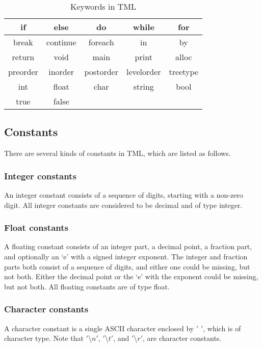 \documentclass[12pt,psfig,a4]{article}
\begin{document}
\begin{table}[!ht]
\begin{center}
\begin{tabular}{| c | c | c | c | c |}
\hline
if & else & do & while & for \\
\hline
break & continue & foreach & in & by     \\  %
\hline
return & void & main & print & alloc \\
\hline
preorder & inorder & postorder & levelorder & treetype\\
\hline
int & float & char & string & bool \\
\hline
true & false & & &\\
\hline
\end{tabular}
\caption{Keywords in TML}
\label{keywords}
\end {center}
\end{table}

\subsection {Constants}
There are several kinds of constants in TML, which are listed as follows.
\subsubsection {Integer constants}
An integer constant consists of a sequence of digits, starting with a non-zero digit. All integer constants are considered to be decimal and of type integer.

\subsubsection {Float constants}
A floating constant consists of an integer part, a decimal point, a fraction part, and optionally an `e' with a signed integer exponent. The integer and fraction parts both consist of a sequence of digits, and either one could be missing, but not both. Either the decimal point or the `e' with the exponent could be missing, but not both. All floating constants are of type float.

\subsubsection {Character constants}
A character constant is a single ASCII character enclosed by $'$ $'$, which is of character type. Note that $'$\textbackslash$n'$, $'$\textbackslash$t'$, and $'$\textbackslash$r'$, are character constants.
\end{document}
